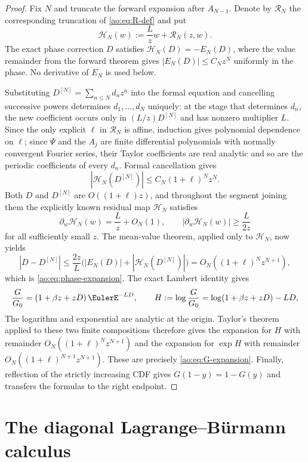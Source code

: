 \begin{proof}
Fix $N$ and truncate the forward expansion after $A_{N-1}$.  Denote by
$\mathcal R_N$ the corresponding truncation of \eqref{ao:eq:R-def} and put
\[
 \mathcal H_N(w):=\frac Lz w+\mathcal R_N(z,w).
\]
The exact phase correction $D$ satisfies
$\mathcal H_N(D)=-E_N(D)$, where the value remainder from the forward
theorem gives $|E_N(D)|\le C_Nz^N$ uniformly in the phase.  No derivative of
$E_N$ is used below.

Substituting $D^{[N]}=\sum_{n\le N}d_nz^n$ into the formal equation and
cancelling successive powers determines $d_1,\ldots,d_N$ uniquely: at the
stage that determines $d_n$, the new coefficient occurs only in
$(L/z)D^{[N]}$ and has nonzero multiplier $L$.  Since the only explicit
$\ell$ in $\mathcal R_N$ is affine, induction gives polynomial dependence
on $\ell$; since $\Psi$ and the $A_j$ are finite differential polynomials
with normally convergent Fourier series, their Taylor coefficients are
real analytic and so are the periodic coefficients of every $d_n$.
Formal cancellation gives
\[
 |\mathcal H_N(D^{[N]})|
 \le C_N(1+\ell)^Nz^N.
\]
Both $D$ and $D^{[N]}$ are $O((1+\ell)z)$, and throughout the segment joining
them the explicitly known residual map $\mathcal H_N$ satisfies
\[
 \partial_w\mathcal H_N(w)=\frac Lz+O_N(1),
 \qquad |\partial_w\mathcal H_N(w)|\ge \frac{L}{2z}
\]
for all sufficiently small $z$.  The mean-value theorem, applied only to
$\mathcal H_N$, now yields
\[
 |D-D^{[N]}|
 \le \frac{2z}{L}
 \bigl(|E_N(D)|+|\mathcal H_N(D^{[N]})|\bigr)
 =O_N((1+\ell)^Nz^{N+1}),
\]
which is \eqref{ao:eq:phase-expansion}.  The exact Lambert identity gives
\begin{equation}
 \frac{G}{\Gzero}=(1+\beta z+zD)\,\EulerE^{-LD},
 \qquad
 H:=\log\frac{G}{\Gzero}=\log(1+\beta z+zD)-LD,
 \label{ao:eq:ratio-exact}
\end{equation}
The logarithm and exponential are analytic at the origin.  Taylor's theorem
applied to these two finite compositions therefore gives the expansion for
$H$ with remainder $O_N((1+\ell)^Nz^{N+1})$ and the expansion for
$\exp H$ with remainder $O_N((1+\ell)^{N+1}z^{N+1})$.  These are precisely
\eqref{ao:eq:G-expansion}.  Finally, reflection of the strictly increasing
CDF gives $G(1-y)=1-G(y)$ and transfers the formulas to the right endpoint.
\end{proof}

\section{The diagonal Lagrange--B\"urmann calculus}
\label{ao:sec:diagonal}

